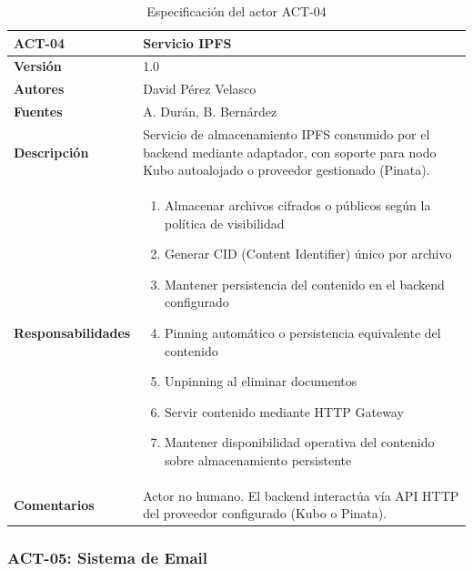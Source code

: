 \documentclass[11pt, a4paper]{article}
\begin{document}
\begin{table}[H]
    \centering
    \small
    \begin{tabular}{|p{4cm}|p{10cm}|}
    \hline
    \textbf{ACT-04} & Servicio IPFS \\
    \hline
    \textbf{Versión} & 1.0 \\
    \hline
    \textbf{Autores} & David Pérez Velasco \\
    \hline
    \textbf{Fuentes} & A. Durán, B. Bernárdez \\
    \hline
    \textbf{Descripción} & Servicio de almacenamiento IPFS consumido por el backend mediante adaptador, con soporte para nodo Kubo autoalojado o proveedor gestionado (Pinata). \\
    \hline
    \textbf{Responsabilidades} & 
    \begin{enumerate}
        \item Almacenar archivos cifrados o públicos según la política de visibilidad
        \item Generar CID (Content Identifier) único por archivo
        \item Mantener persistencia del contenido en el backend configurado
        \item Pinning automático o persistencia equivalente del contenido
        \item Unpinning al eliminar documentos
        \item Servir contenido mediante HTTP Gateway
        \item Mantener disponibilidad operativa del contenido sobre almacenamiento persistente
    \end{enumerate} \\
    \hline
    \textbf{Comentarios} & Actor no humano. El backend interactúa vía API HTTP del proveedor configurado (Kubo o Pinata). \\
    \hline
    \end{tabular}
    \caption{Especificación del actor ACT-04}
\end{table}

\subsubsection{ACT-05: Sistema de Email}
\end{document}

